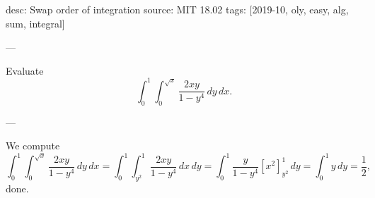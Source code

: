 desc: Swap order of integration
source: MIT 18.02
tags: [2019-10, oly, easy, alg, sum, integral]

---

Evaluate \[\int_0^1\int_0^{\sqrt x}\frac{2xy}{1-y^4}\,dy\,dx.\]

---

We compute \[\int_0^1\int_0^{\sqrt x}\frac{2xy}{1-y^4}\,dy\,dx=\int_0^1\int_{y^2}^1\frac{2xy}{1-y^4}\,dx\,dy=\int_0^1\frac y{1-y^4}\left[x^2\right]^1_{y^2}\,dy=\int_0^1y\,dy=\frac12,\]
done.
